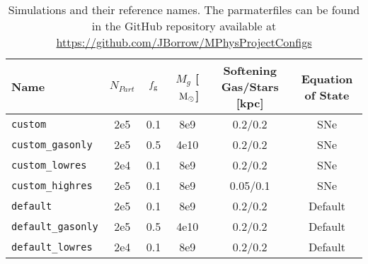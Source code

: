 \begin{table}
    \centering

    \begin{tabular}{l|c|c|c|c|c}

    Name & $N_{Part}$ & $f_\mathrm{g}$ & $M_g$ [$~\mathrm{M}_{\odot}$] & Softening Gas/Stars [kpc] & Equation of State \\
    \hline
    {\tt custom} & 2e5 & 0.1 & 8e9 & 0.2/0.2 & SNe \\
    {\tt custom\_gasonly} & 2e5 & 0.5 & 4e10 & 0.2/0.2 & SNe \\
    {\tt custom\_lowres} & 2e4 & 0.1 & 8e9 & 0.2/0.2 & SNe \\
    {\tt custom\_highres} & 2e5 & 0.1 & 8e9 & 0.05/0.1 & SNe \\
    {\tt default} & 2e5 & 0.1 & 8e9 & 0.2/0.2 & Default \\
    {\tt default\_gasonly} & 2e5 & 0.5 & 4e10 & 0.2/0.2 & Default \\
    {\tt default\_lowres} & 2e4 & 0.1 & 8e9 & 0.2/0.2 & Default \\

    \end{tabular}

    \caption{Simulations and their reference names. The parmaterfiles can be found in the GitHub repository available at \protect\url{https://github.com/JBorrow/MPhysProjectConfigs}}
    \label{tab:sims}
\end{table}
